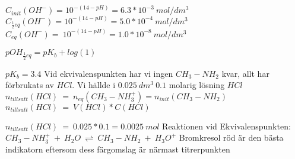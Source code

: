 \documentclass[12pt, letterpaper, twoside]{article}
\begin{document}
\begin{flushleft}
\begin{multicols}{2}
$ C_{init}(OH^-) = 10^{-(14-pH)} = 6.3*10^{-3}\ mol/dm^3 $
\newline
\newline
$ C_{\frac{1}{2}eq}(OH^-) = 10^{-(14-pH)} = 5.0*10^{-4}\ mol/dm^3 $
\newline
\newline
$ C_{eq}(OH^-) =\ 10^{-(14-pH)} = 1.0*10^{-8}\ mol/dm^3 $
\end{multicols}
$ pOH_{\frac{1}{2}eq} = pK_b+log(1) $

$ pK_b = 3.4 $
\newline
\newline
Vid ekvivalenspunkten har vi ingen $ CH_3-NH_2 $ kvar, allt har förbrukats av $ HCl $. Vi hällde i $0.025\ dm^3\ 0.1$
molarig lösning $ HCl $
\newline
\newline
$ n_{tillsatt}(HCl)\ =\ n_{eq}(CH_3-NH_3^+) = n_{init}(CH_3-NH_2) $
\newline
\newline
$ n_{tillsatt}(HCl)\ =\ V(HCl)*C(HCl) $

$ n_{tillsatt}(HCl)\ =\ 0.025*0.1=0.0025\ mol $
\newline
\newline
\break
Reaktionen vid Ekvivalenspunkten:
$ CH_3-NH_3^+\ +\ H_2O\ \rightleftharpoons\ CH_3-NH_2\ +\ H_3O^+ $
\newline
\newline
Bromkresol röd är den bästa indikatorn eftersom dess färgomslag är närmast titrerpunkten

\end{flushleft}
\end{document}
